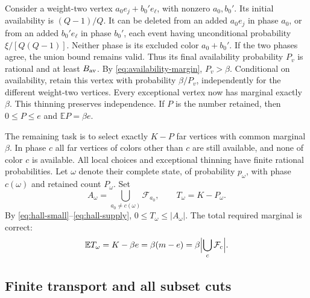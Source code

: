 Consider a weight-two vertex $a_0e_j+b_0'e_\ell$, with nonzero
$a_0,b_0'$.  Its initial availability is $(Q-1)/Q$.  It can be deleted
from an added $a_0e_j$ in phase $a_0$, or from an added $b_0'e_\ell$ in
phase $b_0'$, each event having unconditional probability
$\xi/[Q(Q-1)]$.  Neither phase is its excluded color $a_0+b_0'$.
If the two phases agree, the union bound remains valid.  Thus its final
availability probability $P_v$ is rational and at least $B_{\rm av}$.
By \eqref{eq:availability-margin}, $P_v>\beta$.
Conditional on availability, retain this vertex with probability
$\beta/P_v$, independently for the different weight-two vertices.
Every exceptional vertex now has marginal exactly $\beta$.
This thinning preserves independence.  If $P$ is the number retained,
then $0\le P\le e$ and $\mathbb E P=\beta e$.

The remaining task is to select exactly $K-P$ far vertices with common
marginal $\beta$.  In phase $c$ all far vertices of colors other than
$c$ are still available, and none of color $c$ is available.  All local
choices and exceptional thinning have finite rational probabilities.
Let $\omega$ denote their complete state, of probability $p_\omega$,
with phase $c(\omega)$ and retained count $P_\omega$.  Set
\[
 A_\omega=\bigcup_{a_0\ne c(\omega)}\mathcal F_{a_0},
 \qquad T_\omega=K-P_\omega.
\]
By \eqref{eq:hall-small}--\eqref{eq:hall-supply},
$0\le T_\omega\le|A_\omega|$.  The total required marginal is correct:
\begin{equation}
 \mathbb E T_\omega=K-\beta e
                  =\beta(m-e)=\beta\Bigl|\bigcup_c\mathcal F_c\Bigr|.
 \label{eq:expected-supply}
\end{equation}

\subsection{Finite transport and all subset cuts}

